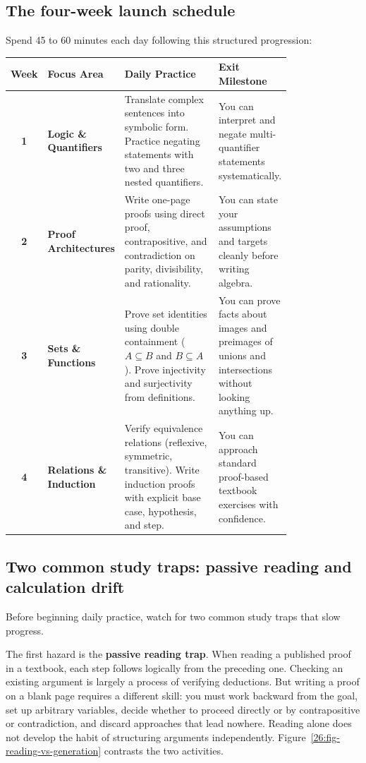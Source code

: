 \subsection{The four-week launch schedule}

Spend 45 to 60 minutes each day following this structured progression:

\begin{longtable}{c >{\raggedright\arraybackslash}p{0.19\linewidth} >{\raggedright\arraybackslash}p{0.36\linewidth} >{\raggedright\arraybackslash}p{0.24\linewidth}}
\toprule
\textbf{Week} & \textbf{Focus Area} & \textbf{Daily Practice} & \textbf{Exit Milestone} \\
\midrule
\textbf{1} & \textbf{Logic \& Quantifiers} & Translate complex sentences into symbolic form. Practice negating statements with two and three nested quantifiers. & You can interpret and negate multi-quantifier statements systematically. \\
\addlinespace
\textbf{2} & \textbf{Proof Architectures} & Write one-page proofs using direct proof, contrapositive, and contradiction on parity, divisibility, and rationality. & You can state your assumptions and targets cleanly before writing algebra. \\
\addlinespace
\textbf{3} & \textbf{Sets \& Functions} & Prove set identities using double containment ($A \subseteq B$ and $B \subseteq A$). Prove injectivity and surjectivity from definitions. & You can prove facts about images and preimages of unions and intersections without looking anything up. \\
\addlinespace
\textbf{4} & \textbf{Relations \& Induction} & Verify equivalence relations (reflexive, symmetric, transitive). Write induction proofs with explicit base case, hypothesis, and step. & You can approach standard proof-based textbook exercises with confidence. \\
\bottomrule
\end{longtable}

\subsection{Two common study traps: passive reading and calculation drift}
\label{26:sec-traps}

Before beginning daily practice, watch for two common study traps that slow progress.

The first hazard is the \textbf{passive reading trap}. When reading a published proof in a textbook, each step follows logically from the preceding one. Checking an existing argument is largely a process of verifying deductions. But writing a proof on a blank page requires a different skill: you must work backward from the goal, set up arbitrary variables, decide whether to proceed directly or by contrapositive or contradiction, and discard approaches that lead nowhere. Reading alone does not develop the habit of structuring arguments independently. Figure~\ref{26:fig-reading-vs-generation} contrasts the two activities.

